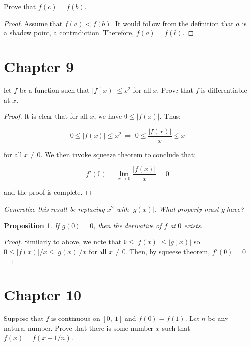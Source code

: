 \documentclass[10pt, oneside]{amsart}
\newenvironment{problem}[2][Problem]{\begin{trivlist}
\item[\hskip \labelsep {\bfseries #1}\hskip \labelsep {\bfseries #2.}]}{\end{trivlist}}
\newtheorem{prop}{Proposition}
\begin{document}
    \begin{problem}{8.20c}
      Prove that $f(a) = f(b)$.
    \end{problem}

    \begin{proof}
      Assume that $f(a) < f(b)$. It would follow from the definition that $a$ is a shadow point, a contradiction. Therefore, $f(a) = f(b)$.
    \end{proof}

    \section{Chapter 9}

    \begin{problem}{9.15}
      let $f$ be a function such that $|f(x)| \leq x^2$ for all $x$. Prove that $f$ is differentiable at $x$.
    \end{problem}

    \begin{proof}
      It is clear that for all $x$, we have $0 \leq |f(x)|$. Thus:

      $$0 \leq |f(x)| \leq x^2 \ \Rightarrow \ 0 \leq \frac{|f(x)|}{x} \leq x$$

      for all $x \neq 0$. We then invoke squeeze theorem to conclude that:

      $$f'(0) = \lim_{x \to 0} \frac{|f(x)|}{x} = 0$$

      and the proof is complete.
    \end{proof}

    \textit{Generalize this result be replacing $x^2$ with $|g(x)|$. What property must $g$ have?}

    \begin{prop}
      If $g(0) = 0$, then the derivative of $f$ at $0$ exists.
    \end{prop}

    \begin{proof}
      Similarly to above, we note that $0 \leq |f(x)| \leq |g(x)|$ so $0 \leq |f(x)|/x \leq |g(x)|/x$ for all $x \neq 0$. Then, by squeeze theorem, $f'(0) = 0$
      \end{proof}

    \section{Chapter 10}

    \begin{problem}{10.19a}
      Suppose that $f$ is continuous on $[0, \ 1]$ and $f(0) = f(1)$. Let $n$ be any natural number. Prove that there is some number $x$
      such that $f(x) = f(x + 1/n)$.
    \end{problem}
\end{document}
